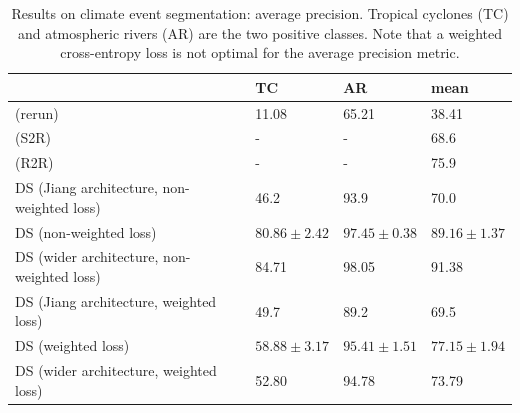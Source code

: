 \documentclass{article} %
\newcommand{\todo}[1]{{\color[rgb]{.6,.1,.6}{#1}}}
\begin{document}
\begin{table}
	\centering
	\begin{tabular}{l l l l}
		\toprule
        & TC & AR & mean \\
		\midrule
		\citet{jiang2019sphericalcnn} (rerun) & 11.08 & 65.21 & 38.41 \\
        \citet{cohen2019gauge} (S2R) & - & -& 68.6 \\
        \citet{cohen2019gauge} (R2R) & - & -& 75.9 \\
		\midrule
        DS (Jiang architecture, non-weighted loss) & 46.2 & 93.9 & 70.0 \\
        DS (non-weighted loss) & $80.86\pm 2.42$ & $97.45\pm 0.38$ & $89.16\pm 1.37$ \\
        DS (wider architecture, non-weighted loss) & 84.71 & 98.05 & 91.38 \\
		\midrule
        DS (Jiang architecture, weighted loss) & 49.7 & 89.2 & 69.5 \\
        DS (weighted loss) & $58.88\pm 3.17$ & $95.41\pm 1.51$ & $77.15\pm 1.94$ \\
        DS (wider architecture, weighted loss) & 52.80 & 94.78 & 73.79 \\
		\bottomrule
    \end{tabular}
    \caption{
		Results on climate event segmentation: average precision.
		Tropical cyclones (TC) and atmospheric rivers (AR) are the two positive classes.
		Note that a weighted cross-entropy loss is not optimal for the average precision metric.
	}
		\label{tab:climate:map}
\end{table}
\end{document}
